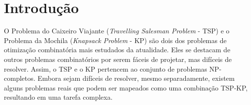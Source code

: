 \chapter{Introdução}








O Problema do Caixeiro Viajante (\textit{Travelling Salesman Problem} - TSP) e o Problema da Mochila (\textit{Knapsack Problem} - KP) são dois dos problemas de otimização combinatória mais estudados da atualidade. Eles se destacam de outros problemas combinatórios por serem fáceis de projetar, mas difíceis de resolver. Assim, o TSP e o KP pertencem ao conjunto de problemas NP-completos. Embora sejam difíceis de resolver, mesmo separadamente, existem alguns problemas reais que podem ser mapeados como uma combinação TSP-KP, resultando em uma tarefa complexa.

